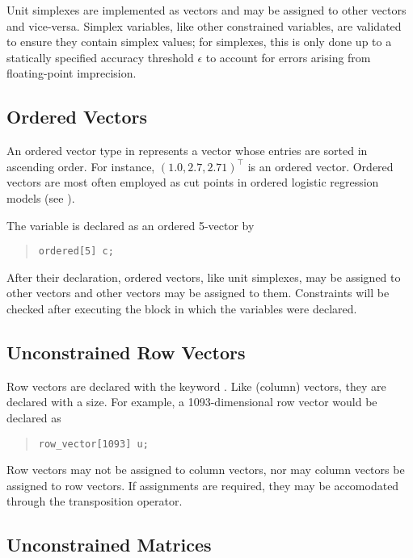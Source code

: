 Unit simplexes are implemented as vectors and may be assigned to other
vectors and vice-versa.  Simplex variables, like other constrained
variables, are validated to ensure they contain simplex values; for
simplexes, this is only done up to a statically specified accuracy
threshold $\epsilon$ to account for errors arising from floating-point
imprecision.


\subsection{Ordered Vectors}

An ordered vector type in \Stan represents a vector whose entries are
sorted in ascending order.  For instance, $(1.0,2.7,2.71)^{\top}$ is
an ordered vector.  Ordered vectors are most often employed as cut
points in ordered logistic regression models (see
).

The variable  is declared as an ordered 5-vector by
%
\begin{quote}
\begin{Verbatim}
ordered[5] c;
\end{Verbatim}
\end{quote}
%
After their declaration, ordered vectors, like unit simplexes, may be
assigned to other vectors and other vectors may be assigned to them.
Constraints will be checked after executing the block in which the
variables were declared.

\subsection{Unconstrained Row Vectors}

Row vectors are declared with the keyword .
Like (column) vectors, they are declared with a size.  For example,
a 1093-dimensional row vector  would be declared as
%
\begin{quote}
\begin{Verbatim}
row_vector[1093] u;
\end{Verbatim}
\end{quote}
%

Row vectors may not be assigned to column vectors, nor may column
vectors be assigned to row vectors.  If assignments are required, they
may be accomodated through the transposition operator.

\subsection{Unconstrained Matrices}

